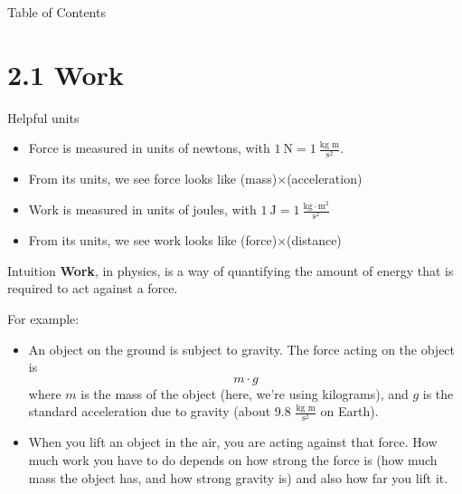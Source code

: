 

 \begin{frame}{Table of Contents }
\mapofcontentsB{\ba}
\label{note2.1a}
 \end{frame}
\section{2.1 Work}
\begin{frame}[t]{Helpful units}
\begin{itemize}[<+->]
\item Force is measured in units of newtons, with $1\ \text{N}=1\ \frac{\text{kg m}}{\text{s}^2}$. 
\item From its units, we see force looks like (mass)$\times$(acceleration)
\item Work is measured in units of joules, with $1\ \text{J}=1\ \frac{\text{kg}\cdot \text{m}^2}{\text{s}^2}$
\item From its units, we see work looks like (force)$\times$(distance)
\end{itemize}

\end{frame}
\begin{frame}[t]
\begin{block}{Intuition}
\textbf{Work}, in physics, is a way of quantifying the amount of energy that is required to act against a force.
\end{block}\pause
For example: 
\begin{itemize}[<+->]
\item An object on the ground is subject to gravity. The force acting on the object is 
\[m\cdot g\]
where $m$ is the mass of the object (here, we're using kilograms), and $g$ is the standard acceleration due to gravity (about 9.8 $\frac{\text{kg m}}{\text{s}^2}$ on Earth).
\item When you lift an object in the air, you are acting against that force. How much work you have to do depends on how strong the force is (how much mass the object has, and how strong gravity is) and also how far you lift it.
\end{itemize}

\end{frame}

